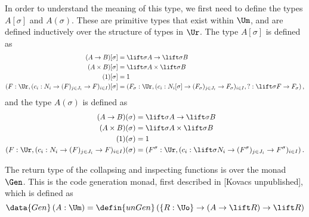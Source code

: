 In order to understand the meaning of this type, we first need to define the
types $A[\sigma]$ and $A(\sigma)$. These are primitive types that exist within
$\Um$, and are defined inductively over the structure of types in $\Ur$. The
type $A[\sigma]$ is defined as
\begin{align*}
  (A \to B)[\sigma]                                                  & = \lift \sigma A \to \lift \sigma B                                                                                           \\
  (A \times B)[\sigma]                                               & = \lift \sigma A \times \lift \sigma B                                                                                        \\
  (1)[\sigma]                                                        & = 1                                                                                                                           \\
  (F : \Ur, (c_i : N_i \to (F)_{j \in J_i} \to F)_{i \in I})[\sigma] & = (F_\sigma : \Ur, (c_i : N_i[\sigma] \to (F_\sigma)_{j \in J_i} \to F_\sigma)_{i \in I}, ?: \lift \sigma F \to F_\sigma) \,,
\end{align*}
and the type $A(\sigma)$ is defined as
\begin{align*}
  (A \to B)(\sigma)                                                  & = \lift \sigma A \to \lift \sigma B                                                                \\
  (A \times B)(\sigma)                                               & = \lift \sigma A \times \lift \sigma B                                                             \\
  (1)(\sigma)                                                        & = 1                                                                                                \\
  (F : \Ur, (c_i : N_i \to (F)_{j \in J_i} \to F)_{i \in I})(\sigma) & = (F^\sigma : \Ur, (c_i : \lift \sigma N_i \to (F^\sigma)_{j \in J_i} \to F^\sigma)_{i \in I}) \,.
\end{align*}

The return type of the collapsing and inspecting functions is over the monad
$\Gen$. This is the code generation monad, first described in [Kovacs
    unpublished], which is defined as
\[
  \data{Gen} \, (A : \Um) = \defin{unGen} \, (\{ R : \Uo \} \to (A \to \lift R) \to \lift R)
\]

